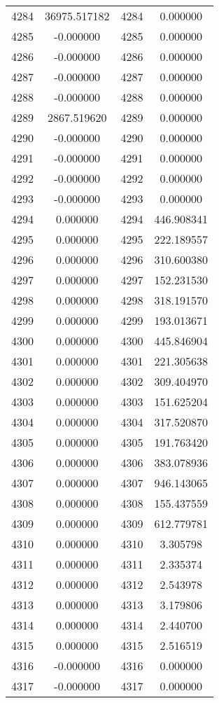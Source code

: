 \documentclass[12pt]{article}
\begin{document}
\begin{longtable}{@{}cccc@{}}
4284 & 36975.517182 & 4284 & 0.000000 \\
4285 & -0.000000 & 4285 & 0.000000 \\
4286 & -0.000000 & 4286 & 0.000000 \\
4287 & -0.000000 & 4287 & 0.000000 \\
4288 & -0.000000 & 4288 & 0.000000 \\
4289 & 2867.519620 & 4289 & 0.000000 \\
4290 & -0.000000 & 4290 & 0.000000 \\
4291 & -0.000000 & 4291 & 0.000000 \\
4292 & -0.000000 & 4292 & 0.000000 \\
4293 & -0.000000 & 4293 & 0.000000 \\
4294 & 0.000000 & 4294 & 446.908341 \\
4295 & 0.000000 & 4295 & 222.189557 \\
4296 & 0.000000 & 4296 & 310.600380 \\
4297 & 0.000000 & 4297 & 152.231530 \\
4298 & 0.000000 & 4298 & 318.191570 \\
4299 & 0.000000 & 4299 & 193.013671 \\
4300 & 0.000000 & 4300 & 445.846904 \\
4301 & 0.000000 & 4301 & 221.305638 \\
4302 & 0.000000 & 4302 & 309.404970 \\
4303 & 0.000000 & 4303 & 151.625204 \\
4304 & 0.000000 & 4304 & 317.520870 \\
4305 & 0.000000 & 4305 & 191.763420 \\
4306 & 0.000000 & 4306 & 383.078936 \\
4307 & 0.000000 & 4307 & 946.143065 \\
4308 & 0.000000 & 4308 & 155.437559 \\
4309 & 0.000000 & 4309 & 612.779781 \\
4310 & 0.000000 & 4310 & 3.305798 \\
4311 & 0.000000 & 4311 & 2.335374 \\
4312 & 0.000000 & 4312 & 2.543978 \\
4313 & 0.000000 & 4313 & 3.179806 \\
4314 & 0.000000 & 4314 & 2.440700 \\
4315 & 0.000000 & 4315 & 2.516519 \\
4316 & -0.000000 & 4316 & 0.000000 \\
4317 & -0.000000 & 4317 & 0.000000 \\

\end{longtable}
\end{document}
